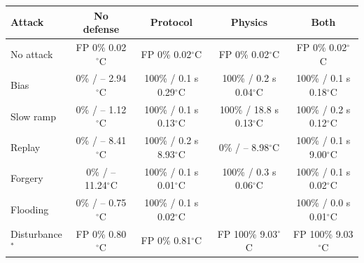 \begin{tabular}{lcccc}
\toprule
Attack & No defense & Protocol & Physics & Both \\
\midrule
No attack & \makecell{FP 0\%\\0.02$^\circ$C} & \makecell{FP 0\%\\0.02$^\circ$C} & \makecell{FP 0\%\\0.02$^\circ$C} & \makecell{FP 0\%\\0.02$^\circ$C} \\
Bias & \makecell{0\% / --\\2.94$^\circ$C} & \makecell{100\% / 0.1 s\\0.29$^\circ$C} & \makecell{100\% / 0.2 s\\0.04$^\circ$C} & \makecell{100\% / 0.1 s\\0.18$^\circ$C} \\
Slow ramp & \makecell{0\% / --\\1.12$^\circ$C} & \makecell{100\% / 0.1 s\\0.13$^\circ$C} & \makecell{100\% / 18.8 s\\0.13$^\circ$C} & \makecell{100\% / 0.2 s\\0.12$^\circ$C} \\
Replay & \makecell{0\% / --\\8.41$^\circ$C} & \makecell{100\% / 0.2 s\\8.93$^\circ$C} & \makecell{0\% / --\\8.98$^\circ$C} & \makecell{100\% / 0.1 s\\9.00$^\circ$C} \\
Forgery & \makecell{0\% / --\\11.24$^\circ$C} & \makecell{100\% / 0.1 s\\0.01$^\circ$C} & \makecell{100\% / 0.3 s\\0.06$^\circ$C} & \makecell{100\% / 0.1 s\\0.02$^\circ$C} \\
Flooding & \makecell{0\% / --\\0.75$^\circ$C} & \makecell{100\% / 0.1 s\\0.02$^\circ$C} &  & \makecell{100\% / 0.0 s\\0.01$^\circ$C} \\
Disturbance$^*$ & \makecell{FP 0\%\\0.80$^\circ$C} & \makecell{FP 0\%\\0.81$^\circ$C} & \makecell{FP 100\%\\9.03$^\circ$C} & \makecell{FP 100\%\\9.03$^\circ$C} \\
\bottomrule
\end{tabular}
